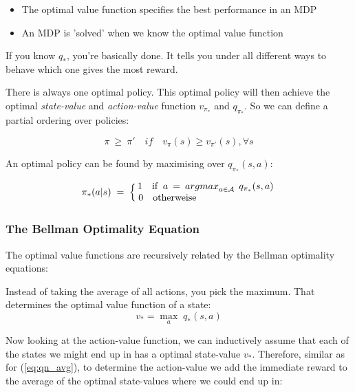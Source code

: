 \documentclass[10pt]{article}
\begin{document}
\begin{itemize}
\item The optimal value function specifies the best performance in an MDP
\item An MDP is 'solved' when we know the optimal value function
\end{itemize}

If you know $q_{*}$, you're basically done. It tells you under all different ways to behave which one gives the most reward.

There is always one optimal policy. This optimal policy will then achieve the optimal \textit{state-value} and \textit{action-value} function $v_{\pi_{*}}$ and $q_{\pi_{*}}$. So we can define a partial ordering over policies:

\begin{equation}
\pi \: \geq \: \pi ' \quad if \quad v_{\pi}(s) \geq v_{\pi'}(s), \forall s
\end{equation}

An optimal policy can be found by maximising over $q_{\pi_{*}}(s,a)$:

\begin{equation}
\pi_{*}(a|s)\;=\; \Big\{ \begin{matrix} 
 1 \quad $if$ \;\; a \: = \: \mathop{argmax}_{a \in \mathcal{A}} \; q_{\pi_{*}}(s,a) \\
\; 0 \quad $otherweise$ \hphantom{abcdedgwfdwfdgh}
\end{matrix}
\end{equation}

\subsubsection*{The Bellman Optimality Equation}

The optimal value functions are recursively related by the Bellman optimality equations:

Instead of taking the average of all actions, you pick the maximum. That determines the optimal value function of a state:
\begin{equation}
v_{*} = \mathop{max}_{a} \; q_{*}(s, a)
\end{equation}

Now looking at the action-value function, we can inductively assume that each of the states we might end up in has a optimal state-value $v_{*}$. Therefore, similar as for (\ref{eq:qn_avg}), to determine the action-value we add the immediate reward to the average of the optimal state-values where we could end up in:
\end{document}
